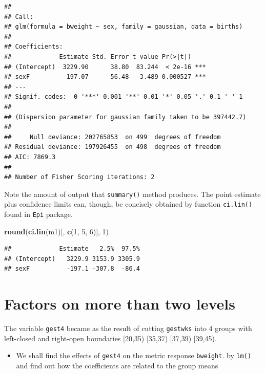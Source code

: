 \documentclass[
]{book}
\newenvironment{Shaded}{\begin{snugshade}}{\end{snugshade}}
\newcommand{\DecValTok}[1]{\textcolor[rgb]{0.00,0.00,0.81}{#1}}
\newcommand{\FunctionTok}[1]{\textcolor[rgb]{0.13,0.29,0.53}{\textbf{#1}}}
\newcommand{\NormalTok}[1]{#1}
\providecommand{\tightlist}{%
  \setlength{\itemsep}{0pt}\setlength{\parskip}{0pt}}
\begin{document}
\begin{verbatim}
## 
## Call:
## glm(formula = bweight ~ sex, family = gaussian, data = births)
## 
## Coefficients:
##             Estimate Std. Error t value Pr(>|t|)    
## (Intercept)  3229.90      38.80  83.244  < 2e-16 ***
## sexF         -197.07      56.48  -3.489 0.000527 ***
## ---
## Signif. codes:  0 '***' 0.001 '**' 0.01 '*' 0.05 '.' 0.1 ' ' 1
## 
## (Dispersion parameter for gaussian family taken to be 397442.7)
## 
##     Null deviance: 202765853  on 499  degrees of freedom
## Residual deviance: 197926455  on 498  degrees of freedom
## AIC: 7869.3
## 
## Number of Fisher Scoring iterations: 2
\end{verbatim}

Note the amount of output that \texttt{summary()} method produces.
The point estimate plus confidence limits can, though, be concisely obtained by function
\texttt{ci.lin()} found in \texttt{Epi} package.

\begin{Shaded}
\begin{Highlighting}[]
\FunctionTok{round}\NormalTok{(}\FunctionTok{ci.lin}\NormalTok{(m1)[, }\FunctionTok{c}\NormalTok{(}\DecValTok{1}\NormalTok{, }\DecValTok{5}\NormalTok{, }\DecValTok{6}\NormalTok{)], }\DecValTok{1}\NormalTok{)}
\end{Highlighting}
\end{Shaded}

\begin{verbatim}
##             Estimate   2.5%  97.5%
## (Intercept)   3229.9 3153.9 3305.9
## sexF          -197.1 -307.8  -86.4
\end{verbatim}

\section{Factors on more than two levels}\label{factors-on-more-than-two-levels}

The variable \texttt{gest4} became as the result of cutting \texttt{gestwks}
into 4 groups with left-closed and right-open boundaries {[}20,35) {[}35,37) {[}37,39) {[}39,45).

\begin{itemize}
\tightlist
\item
  We shall find the effects of \texttt{gest4} on the metric response \texttt{bweight}.
  by \texttt{lm()} and find out how the coefficients are related to the group means
\end{itemize}
\end{document}
